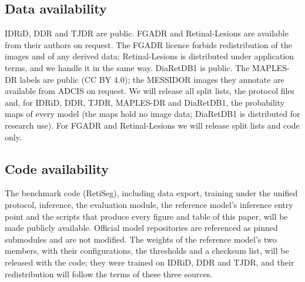 \subsection{Data availability}
IDRiD, DDR and TJDR are public. FGADR and Retinal-Lesions are available from their authors on request. The FGADR licence forbids redistribution of the images and of any derived data; Retinal-Lesions is distributed under application terms, and we handle it in the same way. DiaRetDB1 is public. The MAPLES-DR labels are public (CC BY 4.0); the MESSIDOR images they annotate are available from ADCIS on request. We will release all split lists, the protocol files and, for IDRiD, DDR, TJDR, MAPLES-DR and DiaRetDB1, the probability maps of every model (the maps hold no image data; DiaRetDB1 is distributed for research use). For FGADR and Retinal-Lesions we will release split lists and code only.

\subsection{Code availability}
The benchmark code (RetiSeg), including data export, training under the unified protocol, inference, the evaluation module, the reference model's inference entry point and the scripts that produce every figure and table of this paper, will be made publicly available. Official model repositories are referenced as pinned submodules and are not modified. The weights of the reference model's two members, with their configurations, the thresholds and a checksum list, will be released with the code; they were trained on IDRiD, DDR and TJDR, and their redistribution will follow the terms of these three sources.

\FloatBarrier

